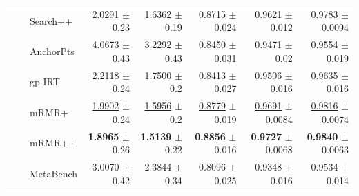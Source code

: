 \begin{longtable}{llp{}rrrrr}
 &  & Search++ & \underline{2.0291} {\scriptsize $\pm$ 0.23} & \underline{1.6362} {\scriptsize $\pm$ 0.19} & \underline{0.8715} {\scriptsize $\pm$ 0.024} & \underline{0.9621} {\scriptsize $\pm$ 0.012} & \underline{0.9783} {\scriptsize $\pm$ 0.0094} \\
 &  & AnchorPts & 4.0673 {\scriptsize $\pm$ 0.43} & 3.2292 {\scriptsize $\pm$ 0.43} & 0.8450 {\scriptsize $\pm$ 0.031} & 0.9471 {\scriptsize $\pm$ 0.02} & 0.9554 {\scriptsize $\pm$ 0.019} \\
 &  & gp-IRT & 2.2118 {\scriptsize $\pm$ 0.24} & 1.7500 {\scriptsize $\pm$ 0.2} & 0.8413 {\scriptsize $\pm$ 0.027} & 0.9506 {\scriptsize $\pm$ 0.016} & 0.9635 {\scriptsize $\pm$ 0.016} \\
 &  & mRMR+ & \underline{1.9902} {\scriptsize $\pm$ 0.24} & \underline{1.5956} {\scriptsize $\pm$ 0.2} & \underline{0.8779} {\scriptsize $\pm$ 0.019} & \underline{0.9691} {\scriptsize $\pm$ 0.0084} & \underline{0.9816} {\scriptsize $\pm$ 0.0074} \\
 &  & mRMR++ & \textbf{1.8965} {\scriptsize $\pm$ 0.26} & \textbf{1.5139} {\scriptsize $\pm$ 0.22} & \textbf{0.8856} {\scriptsize $\pm$ 0.016} & \textbf{0.9727} {\scriptsize $\pm$ 0.0068} & \textbf{0.9840} {\scriptsize $\pm$ 0.0063} \\
 &  & MetaBench & 3.0070 {\scriptsize $\pm$ 0.42} & 2.3844 {\scriptsize $\pm$ 0.34} & 0.8096 {\scriptsize $\pm$ 0.025} & 0.9348 {\scriptsize $\pm$ 0.016} & 0.9534 {\scriptsize $\pm$ 0.014} \\
\end{longtable}